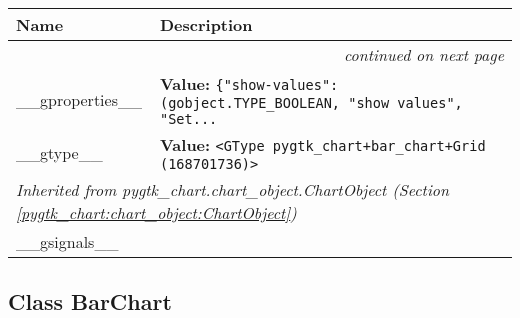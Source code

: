     \vspace{-1cm}
\hspace{\varindent}\begin{longtable}{|p{\varnamewidth}|p{\vardescrwidth}|l}
\cline{1-2}
\cline{1-2} \centering \textbf{Name} & \centering \textbf{Description}& \\
\cline{1-2}
\endhead\cline{1-2}\multicolumn{3}{r}{\small\textit{continued on next page}}\\\endfoot\cline{1-2}
\endlastfoot\raggedright \_\-\_\-g\-p\-r\-o\-p\-e\-r\-t\-i\-e\-s\-\_\-\_\- & \raggedright \textbf{Value:} 
{\tt \{"show-values":(gobject.TYPE\_BOOLEAN, "show values", "Set\texttt{...}}&\\
\cline{1-2}
\raggedright \_\-\_\-g\-t\-y\-p\-e\-\_\-\_\- & \raggedright \textbf{Value:} 
{\tt {\textless}GType pygtk\_chart+bar\_chart+Grid (168701736){\textgreater}}&\\
\cline{1-2}
\multicolumn{2}{|l|}{\textit{Inherited from pygtk\_chart.chart\_object.ChartObject \textit{(Section \ref{pygtk_chart:chart_object:ChartObject})}}}\\
\multicolumn{2}{|p{\varwidth}|}{\raggedright \_\_gsignals\_\_}\\
\cline{1-2}
\end{longtable}



\subsection{Class BarChart}

